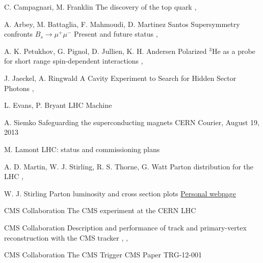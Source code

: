 
{C. Campagnari, M. Franklin}
{The discovery of the top quark}
{, }

{A. Arbey, M. Battaglia, F. Mahmoudi, D. Martinez Santos}
{Supersymmetry confronts $B_s \rightarrow \mu^+ \mu^-$ Present and future status}
{, }

{A. K. Petukhov, G. Pignol, D. Jullien, K. H. Andersen}
{Polarized $^3$He as a probe for short range spin-dependent interactions}
{, }

{J. Jaeckel, A. Ringwald}
{A Cavity Experiment to Search for Hidden Sector Photons}
{, }

{L. Evans, P. Bryant}
{LHC Machine}
{}

{A. Siemko}
{Safeguarding the superconducting magnets}
{CERN Courier, August 19, 2013}

{M. Lamont}
{LHC: status and commissioning plans}
{}

{A. D. Martin, W. J. Stirling, R. S. Thorne, G. Watt}
{Parton distribution for the LHC}
{, }

{W. J. Stirling}
{Parton luminosity and cross section plots}
{\href{http://www.hep.ph.ic.ac.uk/~wstirlin/plots/plots.html}{Personal webpage}}

{CMS Collaboration}
{The CMS experiment at the CERN LHC}
{}

{CMS Collaboration}
{Description and performance of track and primary-vertex reconstruction with the CMS tracker}
{, , }

{CMS Collaboration}
{The CMS Trigger}
{CMS Paper TRG-12-001}

